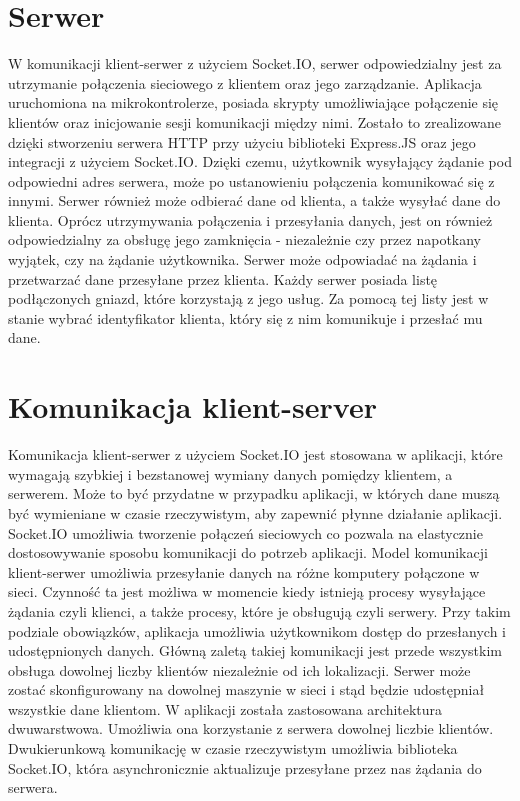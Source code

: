 \section{Serwer}
W komunikacji klient-serwer z użyciem Socket.IO, serwer odpowiedzialny jest za utrzymanie połączenia sieciowego z klientem oraz jego zarządzanie. Aplikacja uruchomiona na mikrokontrolerze, posiada skrypty umożliwiające połączenie się klientów oraz inicjowanie sesji komunikacji między nimi. Zostało to zrealizowane dzięki stworzeniu serwera HTTP przy użyciu biblioteki Express.JS oraz jego integracji z użyciem Socket.IO. Dzięki czemu, użytkownik wysyłający żądanie pod odpowiedni adres serwera, może po ustanowieniu połączenia komunikować się z innymi. Serwer również może odbierać dane od klienta, a także wysyłać dane do klienta. Oprócz utrzymywania połączenia i przesyłania danych, jest on również odpowiedzialny za obsługę jego zamknięcia - niezależnie czy przez napotkany wyjątek, czy na żądanie użytkownika. Serwer może odpowiadać na żądania i przetwarzać dane przesyłane przez klienta. Każdy serwer posiada listę podłączonych gniazd, które korzystają z jego usług. Za pomocą tej listy jest w stanie wybrać identyfikator klienta, który się z nim komunikuje i przesłać mu dane.
\section{Komunikacja klient-server}
Komunikacja klient-serwer z użyciem Socket.IO jest stosowana w aplikacji, które wymagają szybkiej i bezstanowej wymiany danych pomiędzy klientem, a serwerem. Może to być przydatne w przypadku aplikacji, w których dane muszą być wymieniane w czasie rzeczywistym, aby zapewnić płynne działanie aplikacji. Socket.IO umożliwia tworzenie połączeń sieciowych co pozwala na elastycznie dostosowywanie sposobu komunikacji do potrzeb aplikacji. Model komunikacji klient-serwer umożliwia przesyłanie danych na różne komputery połączone w sieci. Czynność ta jest możliwa w momencie kiedy istnieją procesy wysyłające żądania czyli klienci, a także procesy, które je obsługują czyli serwery. Przy takim podziale obowiązków, aplikacja umożliwia użytkownikom dostęp do przesłanych i udostępnionych danych. Główną zaletą takiej komunikacji jest przede wszystkim obsługa dowolnej liczby klientów niezależnie od ich lokalizacji. Serwer może zostać skonfigurowany na dowolnej maszynie w sieci i stąd będzie udostępniał wszystkie dane klientom. W aplikacji została zastosowana architektura dwuwarstwowa. Umożliwia ona korzystanie z serwera dowolnej liczbie klientów. Dwukierunkową komunikację w czasie rzeczywistym umożliwia biblioteka Socket.IO, która asynchronicznie aktualizuje przesyłane przez nas żądania do serwera. 

